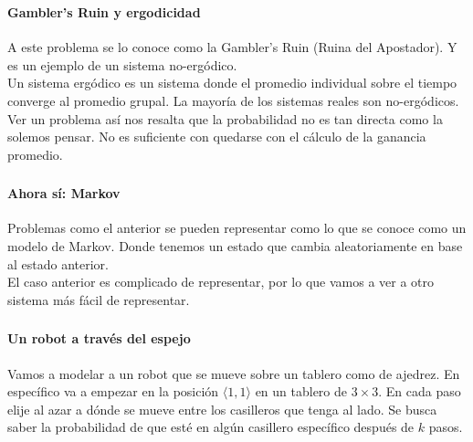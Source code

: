 \documentclass{beamer}
\newcommand{\chess}[1]{\chessboard[addpieces={R#1}]}
\newcommand{\tchess}[1]{\chessboard[tinyboard, addpieces={R#1}]}
\begin{document}
\begin{frame}
  \frametitle{\SECTIONC}
  \framesubtitle{Gambler's Ruin y ergodicidad}

  A este problema se lo conoce como la Gambler's Ruin (Ruina del Apostador). Y es un ejemplo de un sistema no-ergódico. \pause \\
  Un sistema ergódico es un sistema donde el promedio individual sobre el tiempo converge al promedio grupal. \pause La mayoría de los sistemas reales son no-ergódicos. \pause \\
  Ver un problema así nos resalta que la probabilidad no es tan directa como la solemos pensar. No es suficiente con quedarse con el cálculo de la ganancia promedio.
\end{frame}


\begin{frame}
  \frametitle{\SECTIONC}
  \framesubtitle{Ahora sí: Markov}

  Problemas como el anterior se pueden representar como lo que se conoce como un modelo de Markov. Donde tenemos un estado que cambia aleatoriamente en base al estado anterior. \pause \\
  El caso anterior es complicado de representar, por lo que vamos a ver a otro sistema más fácil de representar.

\end{frame}

\newcommand{\GVertex}[4]{\Vertex[L=#1,x=#2,y=#3]{#4}}
\newcommand{\CVertex}[4]{\GVertex{\tchess{#1}}{#2}{#3}{#4}}
\newcommand{\TVertex}[5]{\GVertex{{$\langle #1, #2 \rangle$}}{#3}{#4}{#5}}

\newcommand{\GEdge}[3]{\Edge[label=#1](#2)(#3)}
\newcommand{\GBEdge}[3]{\Edge[style={bend left=30},label=#1](#2)(#3)}

\newcommand{\EJC}{Un robot a través del espejo}

\begin{frame}
  \frametitle{\SECTIONC}
  \framesubtitle{\EJC}

  Vamos a modelar a un robot que se mueve sobre un tablero como de ajedrez. \pause En específico va a empezar en la posición \(\langle 1, 1 \rangle\) en un tablero de \(3 \times 3\). En cada paso elije al azar a dónde se mueve entre los casilleros que tenga al lado. Se busca saber la probabilidad de que esté en algún casillero específico después de \(k\) pasos.

  \begin{figure}[H]
    \centering
    \chess{a1}
  \end{figure}
\end{frame}
\end{document}
